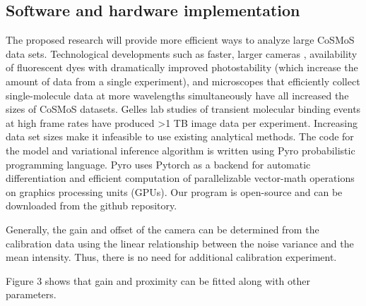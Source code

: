 \subsection{Software and hardware implementation}

The proposed research will provide more efficient ways to analyze large CoSMoS data sets. Technological developments such as faster, larger cameras \citep{Quan2011-cg}, availability of fluorescent dyes with dramatically improved photostability (which increase the amount of data from a single experiment), and microscopes that efficiently collect single-molecule data at more wavelengths simultaneously \citep{Friedman2006-kb} have all increased the sizes of CoSMoS datasets. Gelles lab studies of transient molecular binding events at high frame rates have produced >1 TB image data per experiment. Increasing data set sizes make it infeasible to use existing analytical methods. The code for the model and variational inference algorithm is written using Pyro probabilistic programming language. Pyro uses Pytorch as a backend for automatic differentiation and efficient computation of parallelizable vector-math operations on graphics processing units (GPUs). Our program is open-source and can be downloaded from the github repository.

Generally, the gain and offset of the camera can be determined from the calibration data using the linear relationship between the noise variance and the mean intensity. Thus, there is no need for additional calibration experiment.

Figure 3 shows that gain and proximity can be fitted along with other parameters.